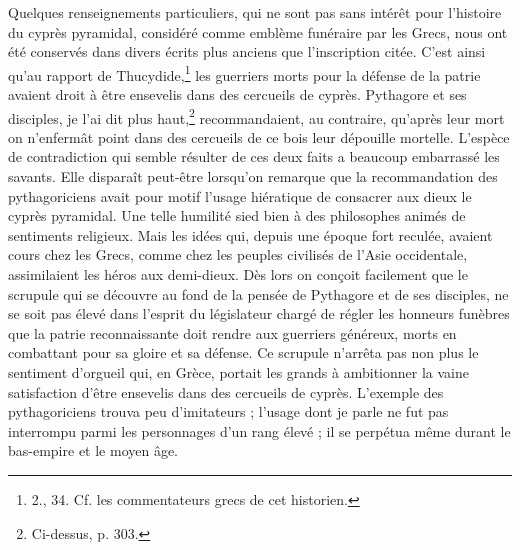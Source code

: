 \documentclass{article}
\begin{document}
Quelques renseignements particuliers, qui ne sont pas sans intérêt pour l'histoire du cyprès pyramidal, considéré comme emblème funéraire par les Grecs, nous ont été conservés dans divers écrits plus anciens que l'inscription citée. C'est ainsi qu'au rapport de Thucydide,\footnote{2., 34. Cf. les commentateurs grecs de cet historien.} les guerriers morts pour la défense de la patrie avaient droit à être ensevelis dans des cercueils de cyprès. Pythagore et ses disciples, je l'ai dit plus haut,\footnote{Ci-dessus, p. 303.} recommandaient, au contraire, qu'après leur mort on n'enfermât point dans des cercueils de ce bois leur dépouille mortelle. L'espèce de contradiction qui semble résulter de ces deux faits a beaucoup embarrassé les savants. Elle disparaît peut-être lorsqu'on remarque que la recommandation des pythagoriciens avait pour motif l'usage hiératique de consacrer aux dieux le cyprès pyramidal. Une telle humilité sied bien à des philosophes animés de sentiments religieux. Mais les idées qui, depuis une époque fort reculée, avaient cours chez les Grecs, comme chez les peuples civilisés de l'Asie occidentale, assimilaient les héros aux demi-dieux. Dès lors on conçoit facilement que le scrupule qui se découvre au fond de la pensée de Pythagore et de ses disciples, ne se soit pas élevé dans l'esprit du législateur chargé de régler les honneurs funèbres que la patrie reconnaissante doit rendre aux guerriers généreux, morts en combattant pour sa gloire et sa défense. Ce scrupule n'arrêta pas non plus le sentiment d'orgueil qui, en Grèce, portait les grands à ambitionner la vaine satisfaction d'être ensevelis dans des cercueils de cyprès. L'exemple des pythagoriciens trouva peu d'imitateurs ; l'usage dont je parle ne fut pas interrompu parmi les personnages d'un rang élevé ; il se perpétua même durant le bas-empire et le moyen âge.
\end{document}
